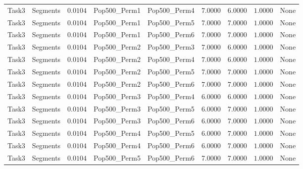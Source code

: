 \documentclass[8pt]{article}
\begin{document}
\begin{longtable}{llccccccc}
Task3 & Segments & $0.0104$ & Pop500\_Perm1 & Pop500\_Perm4 & 7.0000 & 6.0000 & $1.0000$ & None \\
Task3 & Segments & $0.0104$ & Pop500\_Perm1 & Pop500\_Perm5 & 7.0000 & 7.0000 & $1.0000$ & None \\
Task3 & Segments & $0.0104$ & Pop500\_Perm1 & Pop500\_Perm6 & 7.0000 & 7.0000 & $1.0000$ & None \\
Task3 & Segments & $0.0104$ & Pop500\_Perm2 & Pop500\_Perm3 & 7.0000 & 6.0000 & $1.0000$ & None \\
Task3 & Segments & $0.0104$ & Pop500\_Perm2 & Pop500\_Perm4 & 7.0000 & 6.0000 & $1.0000$ & None \\
Task3 & Segments & $0.0104$ & Pop500\_Perm2 & Pop500\_Perm5 & 7.0000 & 7.0000 & $1.0000$ & None \\
Task3 & Segments & $0.0104$ & Pop500\_Perm2 & Pop500\_Perm6 & 7.0000 & 7.0000 & $1.0000$ & None \\
Task3 & Segments & $0.0104$ & Pop500\_Perm3 & Pop500\_Perm4 & 6.0000 & 6.0000 & $1.0000$ & None \\
Task3 & Segments & $0.0104$ & Pop500\_Perm3 & Pop500\_Perm5 & 6.0000 & 7.0000 & $1.0000$ & None \\
Task3 & Segments & $0.0104$ & Pop500\_Perm3 & Pop500\_Perm6 & 6.0000 & 7.0000 & $1.0000$ & None \\
Task3 & Segments & $0.0104$ & Pop500\_Perm4 & Pop500\_Perm5 & 6.0000 & 7.0000 & $1.0000$ & None \\
Task3 & Segments & $0.0104$ & Pop500\_Perm4 & Pop500\_Perm6 & 6.0000 & 7.0000 & $1.0000$ & None \\
Task3 & Segments & $0.0104$ & Pop500\_Perm5 & Pop500\_Perm6 & 7.0000 & 7.0000 & $1.0000$ & None \\
\end{longtable}
\endgroup
\end{document}
